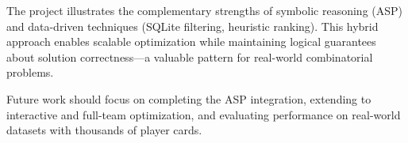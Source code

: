 The project illustrates the complementary strengths of symbolic reasoning (ASP) and data-driven techniques (SQLite filtering, heuristic ranking). This hybrid approach enables scalable optimization while maintaining logical guarantees about solution correctness—a valuable pattern for real-world combinatorial problems.

Future work should focus on completing the ASP integration, extending to interactive and full-team optimization, and evaluating performance on real-world datasets with thousands of player cards.
